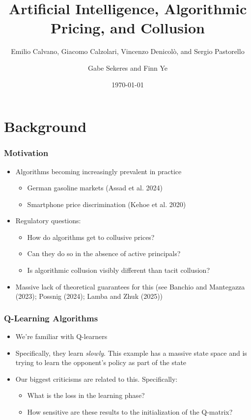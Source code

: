 \documentclass{beamer}
\title{Artificial Intelligence, Algorithmic Pricing, and Collusion}
\subtitle{Emilio Calvano, Giacomo Calzolari, Vincenzo Denicol\`{o}, and Sergio Pastorello}
\date{\today}
\author{Gabe Sekeres and Finn Ye}
\institute{Cornell University}
\begin{document}
\maketitle




\section{Background}

\begin{frame}\frametitle{Motivation}
	\begin{itemize}
		\item Algorithms becoming increasingly prevalent in practice
		\begin{itemize}
			\item German gasoline markets (Assad et al. 2024)
			\item Smartphone price discrimination (Kehoe et al. 2020)
		\end{itemize}
		\item Regulatory questions: \begin{itemize} \item How do algorithms get to collusive prices? \item Can they do so in the absence of active principals? \item Is algorithmic collusion visibly different than tacit collusion? \end{itemize}
		\item Massive lack of theoretical guarantees for this (see Banchio and Mantegazza (2023); Possnig (2024); Lamba and Zhuk (2025))
	\end{itemize}	
\end{frame}

\begin{frame}\frametitle{Q-Learning Algorithms}
	\begin{itemize}
		\item We're familiar with Q-learners 
		\item Specifically, they learn \emph{slowly}. This example has a massive state space and is trying to learn the opponent's policy as part of the state
		\item Our biggest criticisms are related to this. Specifically: \begin{itemize} \item What is the loss in the learning phase? \item How sensitive are these results to the initialization of the Q-matrix?\end{itemize}
	\end{itemize}
\end{frame}
\end{document}
